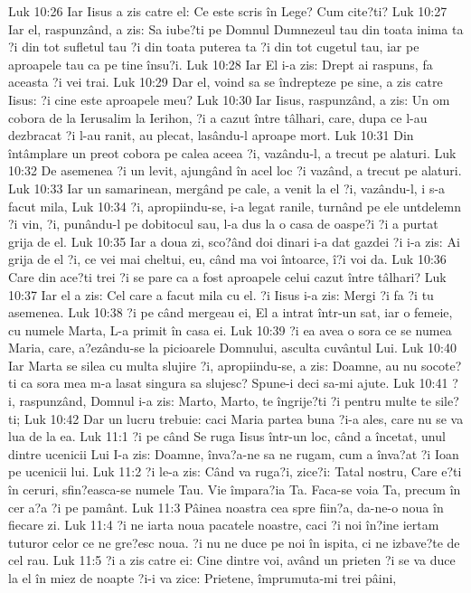 Luk 10:26  Iar Iisus a zis catre el: Ce este scris în Lege? Cum cite?ti?
Luk 10:27  Iar el, raspunzând, a zis: Sa iube?ti pe Domnul Dumnezeul tau din toata inima ta ?i din tot sufletul tau ?i din toata puterea ta ?i din tot cugetul tau, iar pe aproapele tau ca pe tine însu?i.
Luk 10:28  Iar El i-a zis: Drept ai raspuns, fa aceasta ?i vei trai.
Luk 10:29  Dar el, voind sa se îndrepteze pe sine, a zis catre Iisus: ?i cine este aproapele meu?
Luk 10:30  Iar Iisus, raspunzând, a zis: Un om cobora de la Ierusalim la Ierihon, ?i a cazut între tâlhari, care, dupa ce l-au dezbracat ?i l-au ranit, au plecat, lasându-l aproape mort.
Luk 10:31  Din întâmplare un preot cobora pe calea aceea ?i, vazându-l, a trecut pe alaturi.
Luk 10:32  De asemenea ?i un levit, ajungând în acel loc ?i vazând, a trecut pe alaturi.
Luk 10:33  Iar un samarinean, mergând pe cale, a venit la el ?i, vazându-l, i s-a facut mila,
Luk 10:34  ?i, apropiindu-se, i-a legat ranile, turnând pe ele untdelemn ?i vin, ?i, punându-l pe dobitocul sau, l-a dus la o casa de oaspe?i ?i a purtat grija de el.
Luk 10:35  Iar a doua zi, sco?ând doi dinari i-a dat gazdei ?i i-a zis: Ai grija de el ?i, ce vei mai cheltui, eu, când ma voi întoarce, î?i voi da.
Luk 10:36  Care din ace?ti trei ?i se pare ca a fost aproapele celui cazut între tâlhari?
Luk 10:37  Iar el a zis: Cel care a facut mila cu el. ?i Iisus i-a zis: Mergi ?i fa ?i tu asemenea.
Luk 10:38  ?i pe când mergeau ei, El a intrat într-un sat, iar o femeie, cu numele Marta, L-a primit în casa ei.
Luk 10:39  ?i ea avea o sora ce se numea Maria, care, a?ezându-se la picioarele Domnului, asculta cuvântul Lui.
Luk 10:40  Iar Marta se silea cu multa slujire ?i, apropiindu-se, a zis: Doamne, au nu socote?ti ca sora mea m-a lasat singura sa slujesc? Spune-i deci sa-mi ajute.
Luk 10:41  ?i, raspunzând, Domnul i-a zis: Marto, Marto, te îngrije?ti ?i pentru multe te sile?ti;
Luk 10:42  Dar un lucru trebuie: caci Maria partea buna ?i-a ales, care nu se va lua de la ea.
Luk 11:1  ?i pe când Se ruga Iisus într-un loc, când a încetat, unul dintre ucenicii Lui I-a zis: Doamne, înva?a-ne sa ne rugam, cum a înva?at ?i Ioan pe ucenicii lui.
Luk 11:2  ?i le-a zis: Când va ruga?i, zice?i: Tatal nostru, Care e?ti în ceruri, sfin?easca-se numele Tau. Vie împara?ia Ta. Faca-se voia Ta, precum în cer a?a ?i pe pamânt.
Luk 11:3  Pâinea noastra cea spre fiin?a, da-ne-o noua în fiecare zi.
Luk 11:4  ?i ne iarta noua pacatele noastre, caci ?i noi în?ine iertam tuturor celor ce ne gre?esc noua. ?i nu ne duce pe noi în ispita, ci ne izbave?te de cel rau.
Luk 11:5  ?i a zis catre ei: Cine dintre voi, având un prieten ?i se va duce la el în miez de noapte ?i-i va zice: Prietene, împrumuta-mi trei pâini,
